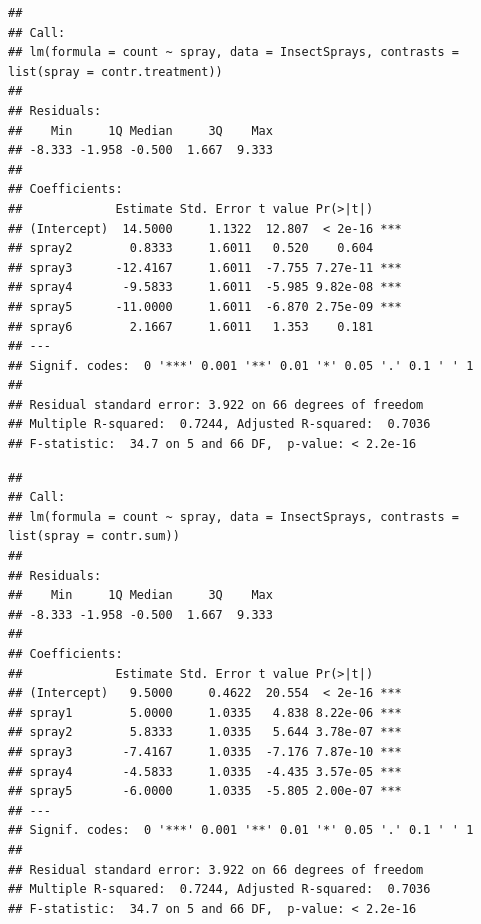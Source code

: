 \documentclass[krantz2]{krantz}\usepackage{knitr}
\begin{document}
\begin{warningbox}
\begin{knitrout}\footnotesize
{}\color{fgcolor}\begin{kframe}
\begin{alltt}
\end{alltt}
\begin{verbatim}
## 
## Call:
## lm(formula = count ~ spray, data = InsectSprays, contrasts = list(spray = contr.treatment))
## 
## Residuals:
##    Min     1Q Median     3Q    Max 
## -8.333 -1.958 -0.500  1.667  9.333 
## 
## Coefficients:
##             Estimate Std. Error t value Pr(>|t|)    
## (Intercept)  14.5000     1.1322  12.807  < 2e-16 ***
## spray2        0.8333     1.6011   0.520    0.604    
## spray3      -12.4167     1.6011  -7.755 7.27e-11 ***
## spray4       -9.5833     1.6011  -5.985 9.82e-08 ***
## spray5      -11.0000     1.6011  -6.870 2.75e-09 ***
## spray6        2.1667     1.6011   1.353    0.181    
## ---
## Signif. codes:  0 '***' 0.001 '**' 0.01 '*' 0.05 '.' 0.1 ' ' 1
## 
## Residual standard error: 3.922 on 66 degrees of freedom
## Multiple R-squared:  0.7244,	Adjusted R-squared:  0.7036 
## F-statistic:  34.7 on 5 and 66 DF,  p-value: < 2.2e-16
\end{verbatim}
\end{kframe}
\end{knitrout}

\begin{knitrout}\footnotesize
{}\color{fgcolor}\begin{kframe}
\begin{alltt}
\end{alltt}
\begin{verbatim}
## 
## Call:
## lm(formula = count ~ spray, data = InsectSprays, contrasts = list(spray = contr.sum))
## 
## Residuals:
##    Min     1Q Median     3Q    Max 
## -8.333 -1.958 -0.500  1.667  9.333 
## 
## Coefficients:
##             Estimate Std. Error t value Pr(>|t|)    
## (Intercept)   9.5000     0.4622  20.554  < 2e-16 ***
## spray1        5.0000     1.0335   4.838 8.22e-06 ***
## spray2        5.8333     1.0335   5.644 3.78e-07 ***
## spray3       -7.4167     1.0335  -7.176 7.87e-10 ***
## spray4       -4.5833     1.0335  -4.435 3.57e-05 ***
## spray5       -6.0000     1.0335  -5.805 2.00e-07 ***
## ---
## Signif. codes:  0 '***' 0.001 '**' 0.01 '*' 0.05 '.' 0.1 ' ' 1
## 
## Residual standard error: 3.922 on 66 degrees of freedom
## Multiple R-squared:  0.7244,	Adjusted R-squared:  0.7036 
## F-statistic:  34.7 on 5 and 66 DF,  p-value: < 2.2e-16
\end{verbatim}
\end{kframe}
\end{knitrout}


\end{warningbox}
\end{document}

